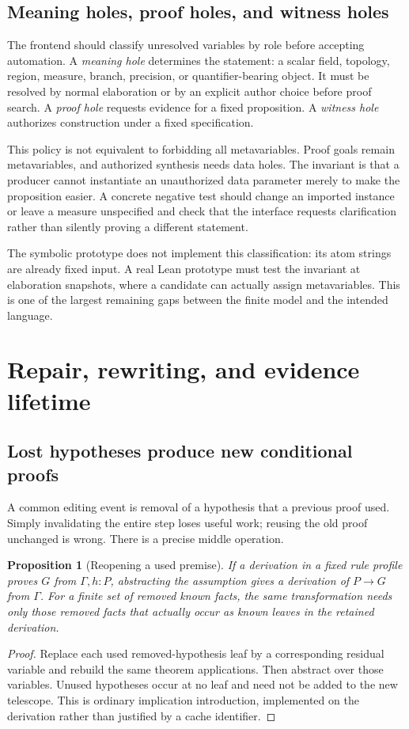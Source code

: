 \documentclass[11pt,a4paper]{article}
\newtheorem{proposition}[theorem]{Proposition}
\theoremstyle{definition}
\theoremstyle{remark}
\begin{document}
\subsection{Meaning holes, proof holes, and witness holes}
The frontend should classify unresolved variables by role before accepting automation. A \emph{meaning hole} determines the statement: a scalar field, topology, region, measure, branch, precision, or quantifier-bearing object. It must be resolved by normal elaboration or by an explicit author choice before proof search. A \emph{proof hole} requests evidence for a fixed proposition. A \emph{witness hole} authorizes construction under a fixed specification.

This policy is not equivalent to forbidding all metavariables. Proof goals remain metavariables, and authorized synthesis needs data holes. The invariant is that a producer cannot instantiate an unauthorized data parameter merely to make the proposition easier. A concrete negative test should change an imported instance or leave a measure unspecified and check that the interface requests clarification rather than silently proving a different statement.

The symbolic prototype does not implement this classification: its atom strings are already fixed input. A real Lean prototype must test the invariant at elaboration snapshots, where a candidate can actually assign metavariables. This is one of the largest remaining gaps between the finite model and the intended language.

\section{Repair, rewriting, and evidence lifetime}\label{sec:repair}
\subsection{Lost hypotheses produce new conditional proofs}
A common editing event is removal of a hypothesis that a previous proof used. Simply invalidating the entire step loses useful work; reusing the old proof unchanged is wrong. There is a precise middle operation.

\begin{proposition}[Reopening a used premise]\label{prop:reopen}
If a derivation in a fixed rule profile proves $G$ from $\Gamma,h:P$, abstracting the assumption gives a derivation of $P\to G$ from $\Gamma$. For a finite set of removed known facts, the same transformation needs only those removed facts that actually occur as known leaves in the retained derivation.
\end{proposition}
\begin{proof}
Replace each used removed-hypothesis leaf by a corresponding residual variable and rebuild the same theorem applications. Then abstract over those variables. Unused hypotheses occur at no leaf and need not be added to the new telescope. This is ordinary implication introduction, implemented on the derivation rather than justified by a cache identifier.
\end{proof}
\end{document}

